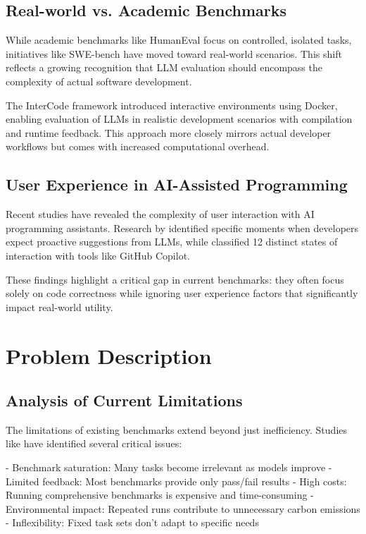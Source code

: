 \section{Real-world vs. Academic Benchmarks}

While academic benchmarks like HumanEval focus on controlled, isolated tasks, initiatives like SWE-bench \cite{jimenez2024swebenchlanguagemodelsresolve} have moved toward real-world scenarios. This shift reflects a growing recognition that LLM evaluation should encompass the complexity of actual software development.

The InterCode framework \cite{yang2023intercodestandardizingbenchmarkinginteractive} introduced interactive environments using Docker, enabling evaluation of LLMs in realistic development scenarios with compilation and runtime feedback. This approach more closely mirrors actual developer workflows but comes with increased computational overhead.

\section{User Experience in AI-Assisted Programming}

Recent studies have revealed the complexity of user interaction with AI programming assistants. Research by \cite{chen2025needhelpdesigningproactive} identified specific moments when developers expect proactive suggestions from LLMs, while \cite{mozannar2024readinglinesmodelinguser} classified 12 distinct states of interaction with tools like GitHub Copilot.

These findings highlight a critical gap in current benchmarks: they often focus solely on code correctness while ignoring user experience factors that significantly impact real-world utility.

\chapter{Problem Description}

\section{Analysis of Current Limitations}

The limitations of existing benchmarks extend beyond just inefficiency. Studies like \cite{vendrow2025largelanguagemodelbenchmarks} have identified several critical issues:

- Benchmark saturation: Many tasks become irrelevant as models improve
- Limited feedback: Most benchmarks provide only pass/fail results
- High costs: Running comprehensive benchmarks is expensive and time-consuming
- Environmental impact: Repeated runs contribute to unnecessary carbon emissions
- Inflexibility: Fixed task sets don't adapt to specific needs

